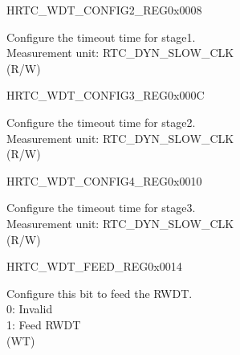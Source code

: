 \begin{register}{H}{RTC\_WDT\_CONFIG2\_REG}{0x0008}\label{regdesc:RTCWDTCONFIG2REG}
%
\regnewline%
\begin{regdesc}\begin{reglist}
\label{fielddesc:RTCWDTSTG1HOLD}\item [RTC\_WDT\_STG1\_HOLD] Configure the timeout time for stage1.\\
Measurement unit: RTC\_DYN\_SLOW\_CLK  \\ (R/W)
\end{reglist}\end{regdesc}
\end{register}


\begin{register}{H}{RTC\_WDT\_CONFIG3\_REG}{0x000C}\label{regdesc:RTCWDTCONFIG3REG}
%
\regnewline%
\begin{regdesc}\begin{reglist}
\label{fielddesc:RTCWDTSTG2HOLD}\item [RTC\_WDT\_STG2\_HOLD] Configure the timeout time for stage2.\\
Measurement unit: RTC\_DYN\_SLOW\_CLK  \\ (R/W)
\end{reglist}\end{regdesc}
\end{register}


\begin{register}{H}{RTC\_WDT\_CONFIG4\_REG}{0x0010}\label{regdesc:RTCWDTCONFIG4REG}
%
\regnewline%
\begin{regdesc}\begin{reglist}
\label{fielddesc:RTCWDTSTG3HOLD}\item [RTC\_WDT\_STG3\_HOLD] Configure the timeout time for stage3.\\
Measurement unit: RTC\_DYN\_SLOW\_CLK  \\ (R/W)
\end{reglist}\end{regdesc}
\end{register}


\begin{register}{H}{RTC\_WDT\_FEED\_REG}{0x0014}\label{regdesc:RTCWDTFEEDREG}
%
%
\regnewline%
\begin{regdesc}\begin{reglist}
\label{fielddesc:RTCWDTRTCWDTFEED}\item [RTC\_WDT\_RTC\_WDT\_FEED] Configure this bit to feed the RWDT.\\
0: Invalid \\
1: Feed RWDT  \\ (WT)
\end{reglist}\end{regdesc}
\end{register}


